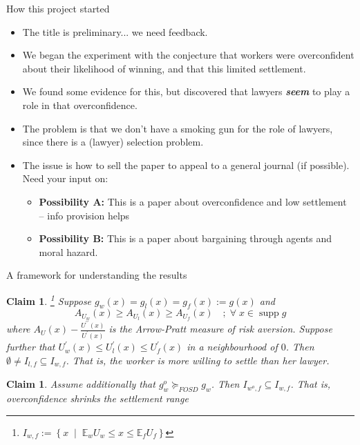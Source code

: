 \documentclass[9pt]{beamer}
\newtheorem{claim}[theorem]{Claim}
\begin{document}
\begin{frame}{How this project started}{}
  \begin{itemize}
  \item {The title is preliminary... we need feedback.}
  \vspace{.1in}
  \item {We began the experiment with the conjecture that workers were overconfident about their likelihood of winning, and that this limited settlement.}
  \vspace{.1in}
  \item {We found some evidence for this, but discovered that lawyers \textit{\textbf{seem}} to play a role in that overconfidence.}
  \vspace{.1in}
  \item{The problem is that we don't have a smoking gun for the role of lawyers, since there is a (lawyer) selection problem.}
  \vspace{.1in}
  \item The issue is how to sell the paper to appeal to a general journal (if possible). Need your input on:
    \begin{itemize}
        \item \alert{\textbf{Possibility A:}} This is a paper about overconfidence and low settlement -- info provision helps
        \item \alert{\textbf{Possibility B:}} This is a paper about bargaining through agents and moral hazard.
    \end{itemize}
       \end{itemize}
\end{frame}


\begin{frame}{A framework for understanding the results}
    
    
\begin{claim}\footnote{$I_{w,f}:=\left\{x\;\;|\;\;\mathbb{E}_wU_w\leq x\leq\mathbb{E}_fU_f\right\}$}
\label{claim1}
Suppose $g_w(x)=g_l(x)=g_f(x):=g(x)$  and 
\[A_{U_w}(x)\geq A_{U_l}(x)\geq A_{U_f}(x)\quad ;\;\forall\;x\in \operatorname{supp} g \]
where $A_{U}(x)-\frac{U^{\prime\prime}(x)}{U^{\prime}(x)}$ is the Arrow-Pratt measure of risk aversion. Suppose further that $U_w^{\prime}(x)\leq U_l^{\prime}(x)\leq U_f^{\prime}(x)$ in a neighbourhood of $0$. Then $\emptyset\neq I_{l,f}\subseteq I_{w,f}$. That is, the worker is more willing to settle than her lawyer.
\end{claim}



\begin{claim}
\label{claim2}
Assume additionally that $g^o_w \succeq_{FOSD} g_w$. Then $I_{w^o,f} \subseteq I_{w,f}$. That is, overconfidence shrinks the settlement range
\end{claim}
\end{frame}
\end{document}
